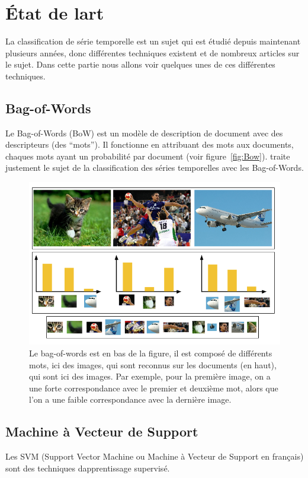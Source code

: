 \documentclass[11pt]{sdm}
\begin{document}
\section{\'Etat de l\textquotesingle art}
	La classification de s\'erie temporelle est un sujet qui est \'etudi\'e depuis maintenant plusieurs ann\'ees, donc diff\'erentes techniques existent et de nombreux articles sur le sujet. Dans cette partie nous allons voir quelques unes de ces diff\'erentes techniques.

	\subsection{Bag-of-Words}	
		Le Bag-of-Words (BoW) est un mod\`ele de description de document avec des descripteurs (des “mots”). Il fonctionne en attribuant des mots aux documents, chaques mots ayant un probabilit\'e par document (voir figure~\ref{fig:Bow}). \cite{bailly2015bag} traite justement le sujet de la classification des s\'eries temporelles avec les Bag-of-Words.

		\begin{figure}[!ht]
			\centering
			\includegraphics[scale=0.6,natwidth=680,natheight=440]{figures/bagOfWords.png}
			\caption{Le bag-of-words est en bas de la figure, il est compos\'e de diff\'erents mots, ici des images, qui sont reconnus sur les documents (en haut), qui sont ici des images. Par exemple, pour la premi\`ere image, on a une forte correspondance avec le premier et deuxi\`eme mot, alors que l’on a une faible correspondance avec la derni\`ere image.}
			\label{fig:BoW}
		\end{figure}

	\subsection{Machine \`a Vecteur de Support}
		Les SVM (Support Vector Machine ou Machine \`a Vecteur de Support en fran\c cais) sont des techniques d\textquotesingle apprentissage supervis\'e. 
\end{document}
